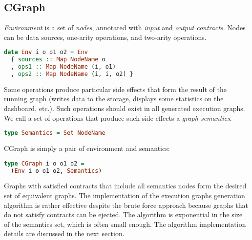 \subsection{CGraph}

{\em Environment} is a set of {\em nodes}, annotated with {\em input} and {\em output contracts}.
Nodes can be data sources, one-arity operations, and two-arity operations.

\begin{lstlisting}[language=Haskell]
data Env i o o1 o2 = Env
  { sources :: Map NodeName o
  , ops1 :: Map NodeName (i, o1)
  , ops2 :: Map NodeName (i, i, o2) }
\end{lstlisting}

Some operations produce particular side effects that form the result of the running graph (writes data to the storage, displays some statistics on the dashboard, etc.).
Such operations should exist in all generated execution graphs.
We call a set of operations that produce such side effects a {\em graph semantics}.

\begin{lstlisting}[language=Haskell]
type Semantics = Set NodeName
\end{lstlisting}

CGraph is simply a pair of environment and semantics:

\begin{lstlisting}[language=Haskell]
type CGraph i o o1 o2 = 
  (Env i o o1 o2, Semantics)
\end{lstlisting}

Graphs with satisfied contracts that include all semantics nodes form the desired set of equivalent graphs. 
The implementation of the execution graphs generation algorithm is rather effective despite the brute force approach because graphs that do not satisfy contracts can be ejected. 
The algorithm is exponential in the size of the semantics set, which is often small enough.
The algorithm implementation details are discussed in the next section.
